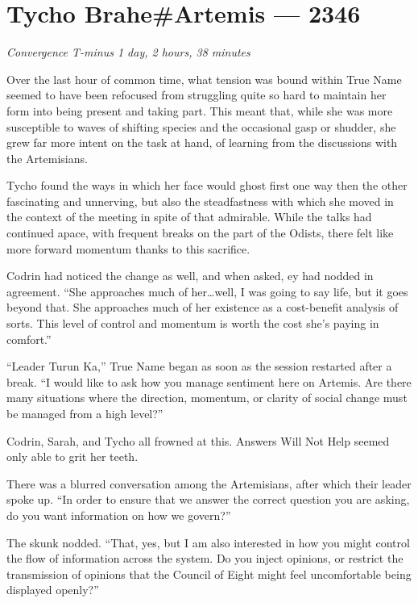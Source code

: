 \hypertarget{tycho-braheartemis-2346}{%
\chapter{Tycho Brahe\#Artemis — 2346}}

\begin{center}
\emph{Convergence T-minus 1 day, 2 hours, 38 minutes}
\end{center}

\noindent Over the last hour of common time, what tension was bound within True Name seemed to have been refocused from struggling quite so hard to maintain her form into being present and taking part. This meant that, while she was more susceptible to waves of shifting species and the occasional gasp or shudder, she grew far more intent on the task at hand, of learning from the discussions with the Artemisians.

Tycho found the ways in which her face would ghost first one way then the other fascinating and unnerving, but also the steadfastness with which she moved in the context of the meeting in spite of that admirable. While the talks had continued apace, with frequent breaks on the part of the Odists, there felt like more forward momentum thanks to this sacrifice.

Codrin had noticed the change as well, and when asked, ey had nodded in agreement. ``She approaches much of her\ldots well, I was going to say life, but it goes beyond that. She approaches much of her existence as a cost-benefit analysis of sorts. This level of control and momentum is worth the cost she's paying in comfort.''

``Leader Turun Ka,'' True Name began as soon as the session restarted after a break. ``I would like to ask how you manage sentiment here on Artemis. Are there many situations where the direction, momentum, or clarity of social change must be managed from a high level?''

Codrin, Sarah, and Tycho all frowned at this. Answers Will Not Help seemed only able to grit her teeth.

There was a blurred conversation among the Artemisians, after which their leader spoke up. ``In order to ensure that we answer the correct question you are asking, do you want information on how we govern?''

The skunk nodded. ``That, yes, but I am also interested in how you might control the flow of information across the system. Do you inject opinions, or restrict the transmission of opinions that the Council of Eight might feel uncomfortable being displayed openly?''

